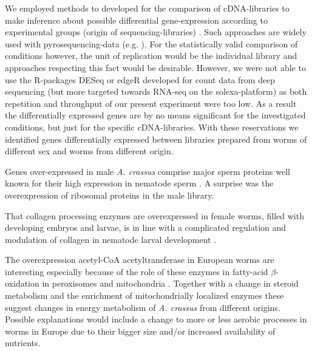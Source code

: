 \documentclass[10pt]{bmc_article}
\newenvironment{bmcformat}{\begin{raggedright}\baselineskip20pt\sloppy\setboolean{publ}{false}}{\end{raggedright}\baselineskip20pt\sloppy}
\begin{document}
\begin{bmcformat}
We employed methods to developed for the comparison of cDNA-libraries
to make inference about possible differential gene-expression
according to experimental groups (origin of sequencing-libraries)
\cite{pmid9331369}. Such approaches are widely used with
pyrosequencing-data (e.g. \cite{pmid20470405}). For the statistically
valid comparison of conditions however, the unit of replication would
be the individual library and approaches respecting this fact would be
desirable. However, we were not able to use the R-packages DESeq
\cite{pmid20979621} or edgeR \cite{pmid19910308} developed for count
data from deep sequencing (but more targeted towards RNA-seq on the
solexa-platform) as both repetition and throughput of our present
experiment were too low. As a result the differentially expressed
genes are by no means significant for the investigated conditions, but
just for the specific cDNA-libraries. With these reservations we
identified genes differentially expressed between libraries prepared
from worms of different sex and worms from different origin.

Genes over-expressed in male \textit{A. crassus} comprise major sperm
proteins well known for their high expression in nematode sperm
\cite{pmid15275275}. A surprise was the overexpression of ribosomal
proteins in the male library.

That collagen processing enzymes are overexpressed in female worms,
filled with developing embryos and larvae, is in line with a
complicated regulation and modulation of collagen in nematode larval
development \cite{pmid10637627}.

The overexpression acetyl-CoA acetyltransferase in European worms are
interesting especially because of the role of these enzymes in
fatty-acid $\beta$-oxidation in peroxisomes and mitochondria
\cite{pmid4721607}. Together with a change in steroid metabolism and
the enrichment of mitochondrially localized enzymes these suggest
changes in energy metabolism of \textit{A. crassus} from different
origins. Possible explanations would include a change to more or less
aerobic processes in worms in Europe due to their bigger size and/or
increased availability of nutrients.


\end{bmcformat}
\end{document}
